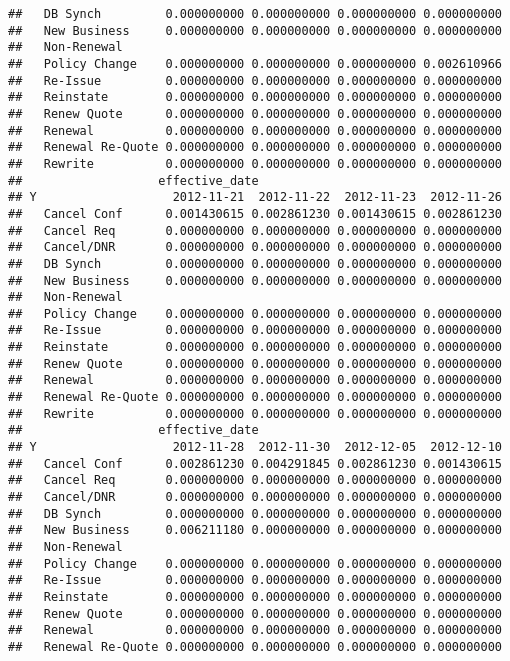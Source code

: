 \documentclass[]{article}
\begin{document}
\begin{verbatim}
##   DB Synch         0.000000000 0.000000000 0.000000000 0.000000000
##   New Business     0.000000000 0.000000000 0.000000000 0.000000000
##   Non-Renewal                                                     
##   Policy Change    0.000000000 0.000000000 0.000000000 0.002610966
##   Re-Issue         0.000000000 0.000000000 0.000000000 0.000000000
##   Reinstate        0.000000000 0.000000000 0.000000000 0.000000000
##   Renew Quote      0.000000000 0.000000000 0.000000000 0.000000000
##   Renewal          0.000000000 0.000000000 0.000000000 0.000000000
##   Renewal Re-Quote 0.000000000 0.000000000 0.000000000 0.000000000
##   Rewrite          0.000000000 0.000000000 0.000000000 0.000000000
##                   effective_date
## Y                   2012-11-21  2012-11-22  2012-11-23  2012-11-26
##   Cancel Conf      0.001430615 0.002861230 0.001430615 0.002861230
##   Cancel Req       0.000000000 0.000000000 0.000000000 0.000000000
##   Cancel/DNR       0.000000000 0.000000000 0.000000000 0.000000000
##   DB Synch         0.000000000 0.000000000 0.000000000 0.000000000
##   New Business     0.000000000 0.000000000 0.000000000 0.000000000
##   Non-Renewal                                                     
##   Policy Change    0.000000000 0.000000000 0.000000000 0.000000000
##   Re-Issue         0.000000000 0.000000000 0.000000000 0.000000000
##   Reinstate        0.000000000 0.000000000 0.000000000 0.000000000
##   Renew Quote      0.000000000 0.000000000 0.000000000 0.000000000
##   Renewal          0.000000000 0.000000000 0.000000000 0.000000000
##   Renewal Re-Quote 0.000000000 0.000000000 0.000000000 0.000000000
##   Rewrite          0.000000000 0.000000000 0.000000000 0.000000000
##                   effective_date
## Y                   2012-11-28  2012-11-30  2012-12-05  2012-12-10
##   Cancel Conf      0.002861230 0.004291845 0.002861230 0.001430615
##   Cancel Req       0.000000000 0.000000000 0.000000000 0.000000000
##   Cancel/DNR       0.000000000 0.000000000 0.000000000 0.000000000
##   DB Synch         0.000000000 0.000000000 0.000000000 0.000000000
##   New Business     0.006211180 0.000000000 0.000000000 0.000000000
##   Non-Renewal                                                     
##   Policy Change    0.000000000 0.000000000 0.000000000 0.000000000
##   Re-Issue         0.000000000 0.000000000 0.000000000 0.000000000
##   Reinstate        0.000000000 0.000000000 0.000000000 0.000000000
##   Renew Quote      0.000000000 0.000000000 0.000000000 0.000000000
##   Renewal          0.000000000 0.000000000 0.000000000 0.000000000
##   Renewal Re-Quote 0.000000000 0.000000000 0.000000000 0.000000000

\end{verbatim}
\end{document}
